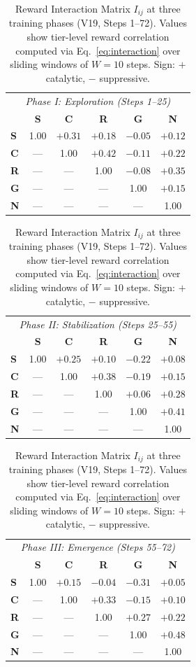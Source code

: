 \documentclass[sigconf]{acmart}
\begin{document}
\begin{table}[t]
\centering
\small
\caption{Reward Interaction Matrix $I_{ij}$ at three training phases (V19, Steps 1--72). Values show tier-level reward correlation computed via Eq.~\ref{eq:interaction} over sliding windows of $W=10$ steps. Sign: $+$ catalytic, $-$ suppressive.}
\label{tab:interaction}
\begin{tabular}{@{}l ccccc @{}}
\toprule
\multicolumn{6}{c}{\textit{Phase I: Exploration (Steps 1--25)}} \\
 & \textbf{S} & \textbf{C} & \textbf{R} & \textbf{G} & \textbf{N} \\
\midrule
\textbf{S} & 1.00 & $+0.31$ & $+0.18$ & $-0.05$ & $+0.12$ \\
\textbf{C} & — & 1.00 & $+0.42$ & $-0.11$ & $+0.22$ \\
\textbf{R} & — & — & 1.00 & $-0.08$ & $+0.35$ \\
\textbf{G} & — & — & — & 1.00 & $+0.15$ \\
\textbf{N} & — & — & — & — & 1.00 \\
\bottomrule
\end{tabular}

\vspace{0.3em}

\begin{tabular}{@{}l ccccc @{}}
\toprule
\multicolumn{6}{c}{\textit{Phase II: Stabilization (Steps 25--55)}} \\
 & \textbf{S} & \textbf{C} & \textbf{R} & \textbf{G} & \textbf{N} \\
\midrule
\textbf{S} & 1.00 & $+0.25$ & $+0.10$ & $\mathbf{-0.22}$ & $+0.08$ \\
\textbf{C} & — & 1.00 & $+0.38$ & $\mathbf{-0.19}$ & $+0.15$ \\
\textbf{R} & — & — & 1.00 & $+0.06$ & $+0.28$ \\
\textbf{G} & — & — & — & 1.00 & $\mathbf{+0.41}$ \\
\textbf{N} & — & — & — & — & 1.00 \\
\bottomrule
\end{tabular}

\vspace{0.3em}

\begin{tabular}{@{}l ccccc @{}}
\toprule
\multicolumn{6}{c}{\textit{Phase III: Emergence (Steps 55--72)}} \\
 & \textbf{S} & \textbf{C} & \textbf{R} & \textbf{G} & \textbf{N} \\
\midrule
\textbf{S} & 1.00 & $+0.15$ & $-0.04$ & $\mathbf{-0.31}$ & $+0.05$ \\
\textbf{C} & — & 1.00 & $+0.33$ & $-0.15$ & $+0.10$ \\
\textbf{R} & — & — & 1.00 & $\mathbf{+0.27}$ & $+0.22$ \\
\textbf{G} & — & — & — & 1.00 & $\mathbf{+0.48}$ \\
\textbf{N} & — & — & — & — & 1.00 \\
\bottomrule
\end{tabular}
\end{table}
\end{document}
